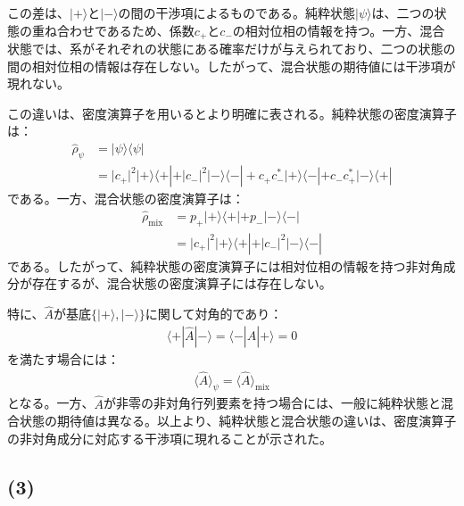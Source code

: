 \documentclass[platex,dvipdfmx,a4paper]{jsarticle}
\begin{document}
この差は、$\lvert+\rangle$と$\lvert-\rangle$の間の干渉項によるものである。純粋状態$\lvert\psi\rangle$は、二つの状態の重ね合わせであるため、係数$c_+$と$c_-$の相対位相の情報を持つ。一方、混合状態では、系がそれぞれの状態にある確率だけが与えられており、二つの状態の間の相対位相の情報は存在しない。したがって、混合状態の期待値には干渉項が現れない。

この違いは、密度演算子を用いるとより明確に表される。純粋状態の密度演算子は：
\begin{align*}
  \hat{\rho}_\psi
  &=\lvert\psi\rangle\langle\psi| \\
  &=\lvert c_+\rvert^2\lvert+\rangle\langle+|
    +\lvert c_-\rvert^2\lvert-\rangle\langle-|
    +c_+c_-^*\lvert+\rangle\langle-|
    +c_-c_+^*\lvert-\rangle\langle+|
\end{align*}
である。一方、混合状態の密度演算子は：
\begin{align*}
  \hat{\rho}_{\mathrm{mix}}
  &=p_+\lvert+\rangle\langle+|
    +p_-\lvert-\rangle\langle-| \\
  &=\lvert c_+\rvert^2\lvert+\rangle\langle+|
    +\lvert c_-\rvert^2\lvert-\rangle\langle-|
\end{align*}
である。したがって、純粋状態の密度演算子には相対位相の情報を持つ非対角成分が存在するが、混合状態の密度演算子には存在しない。

特に、$\hat{A}$が基底$\{\lvert+\rangle,\lvert-\rangle\}$に関して対角的であり：
\begin{align*}
  \langle+|\hat{A}|-\rangle
  =\langle-|\hat{A}|+\rangle
  =0
\end{align*}
を満たす場合には：
\begin{align*}
  \langle\hat{A}\rangle_\psi
  =\langle\hat{A}\rangle_{\mathrm{mix}}
\end{align*}
となる。一方、$\hat{A}$が非零の非対角行列要素を持つ場合には、一般に純粋状態と混合状態の期待値は異なる。以上より、純粋状態と混合状態の違いは、密度演算子の非対角成分に対応する干渉項に現れることが示された。

\subsection*{(3)}
\end{document}
